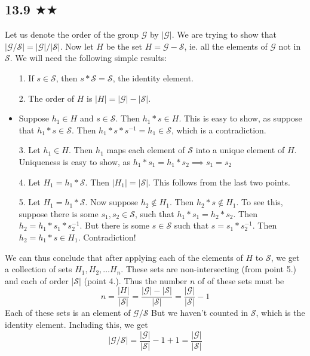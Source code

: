 \subsection{13.9 $\bigstar \bigstar $}
Let us denote the order of the group $\mathcal{G}$ by $|\mathcal{G}|$. We are trying to show that $|\mathcal{G}/\mathcal{S}|=|\mathcal{G}|/|\mathcal{S}|$. Now let $H$ be the set $H=\mathcal{G}-\mathcal{S}$, ie. all the elements of $\mathcal{G}$ not in $\mathcal{S}$. We will need the following simple results:
\begin{itemize}
\item[1.] If $s\in\mathcal{S}$, then $s*\mathcal{S}=\mathcal{S}$, the identity element.
\item[2.] The order of $H$ is $|H|=|\mathcal{G}|-|\mathcal{S}|$.
\item Suppose $h_1\in H$ and $s\in\mathcal{S}$. Then $h_1* s\in H$. This is easy to show, as suppose that $h_1*s\in \mathcal{S}$. Then $h_1 *s*s^{-1}=h_1\in \mathcal{S}$, which is a contradiction.
\item[3.] Let $h_1\in H$. Then $h_1$ maps each element of $\mathcal{S}$ into a unique element of $H$. Uniqueness is easy to show, as $h_1*s_1=h_1*s_2\implies s_1=s_2$
\item[4.] Let $H_1=h_1*\mathcal{S}$. Then $|H_1|=|\mathcal{S}|$. This follows from the last two points.
\item[5.] Let $H_1=h_1*\mathcal{S}$. Now suppose $h_2\notin H_1$. Then $h_2*s \notin H_1$. To see this, suppose there is some $s_1,s_2\in \mathcal{S}$, such that $h_1*s_1=h_2*s_2$. Then $h_2=h_1*s_1*s^{-1}_{2}$. But there is some $s\in \mathcal{S}$ such that $s=s_1*s^{-1}_{2}$. Then $h_2=h_1*s\in H_1$. Contradiction!
\end{itemize}
We can thus conclude that after applying each of the elements of $H$ to $\mathcal{S}$, we get a collection of sets $H_1,H_2,\ldots H_n$. These sets are non-intersecting (from point 5.) and each of order $|\mathcal{S}|$ (point 4.). Thus the number $n$ of of these sets must be 
$$n=\frac{|H|}{|\mathcal{S}|}=\frac{|\mathcal{G}|-|\mathcal{S}|}{|\mathcal{S}|}=\frac{|\mathcal{G}|}{|\mathcal{S}|}-1$$
Each of these sets is an element of $\mathcal{G}/\mathcal{S}$ But we haven't counted in $\mathcal{S}$, which is the identity element. Including this, we get
$$|\mathcal{G}/\mathcal{S}|=\frac{|\mathcal{G}|}{|\mathcal{S}|}-1+1=\frac{|\mathcal{G}|}{|\mathcal{S}|}$$
